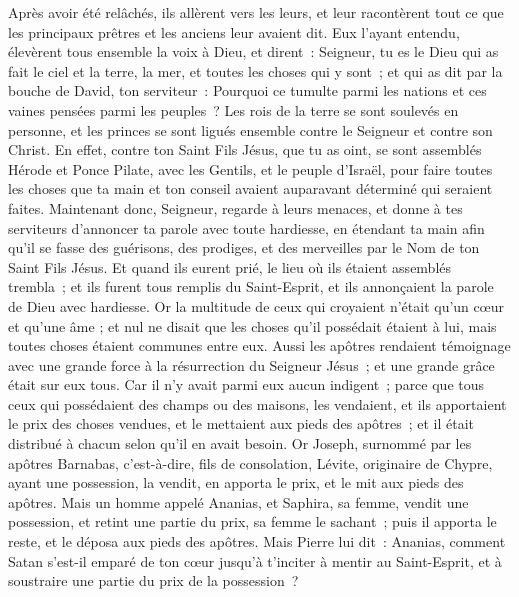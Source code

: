 \begin{multicols}{2}
Après avoir été relâchés, ils allèrent vers les leurs, et leur racontèrent tout ce que les principaux prêtres et les anciens leur avaient dit.
Eux l'ayant entendu, élevèrent tous ensemble la voix à Dieu, et dirent~: Seigneur, tu es le Dieu qui as fait le ciel et la terre, la mer, et toutes les choses qui y sont~;
et qui as dit par la bouche de David, ton serviteur~: Pourquoi ce tumulte parmi les nations et ces vaines pensées parmi les peuples~?
Les rois de la terre se sont soulevés en personne, et les princes se sont ligués ensemble contre le Seigneur et contre son Christ.
En effet, contre ton Saint Fils Jésus, que tu as oint, se sont assemblés Hérode et Ponce Pilate, avec les Gentils, et le peuple d'Israël,
pour faire toutes les choses que ta main et ton conseil avaient auparavant déterminé qui seraient faites.
Maintenant donc, Seigneur, regarde à leurs menaces, et donne à tes serviteurs d'annoncer ta parole avec toute hardiesse,
en étendant ta main afin qu'il se fasse des guérisons, des prodiges, et des merveilles par le Nom de ton Saint Fils Jésus.
Et quand ils eurent prié, le lieu où ils étaient assemblés trembla~; et ils furent tous remplis du Saint-Esprit, et ils annonçaient la parole de Dieu avec hardiesse.
Or la multitude de ceux qui croyaient n'était qu'un cœur et qu'une âme ; et nul ne disait que les choses qu'il possédait étaient à lui, mais toutes choses étaient communes entre eux.
Aussi les apôtres rendaient témoignage avec une grande force à la résurrection du Seigneur Jésus~; et une grande grâce était sur eux tous.
Car il n'y avait parmi eux aucun indigent~; parce que tous ceux qui possédaient des champs ou des maisons, les vendaient, et ils apportaient le prix des choses vendues,
et le mettaient aux pieds des apôtres~; et il était distribué à chacun selon qu'il en avait besoin.
Or Joseph, surnommé par les apôtres Barnabas, c'est-à-dire, fils de consolation, Lévite, originaire de Chypre,
ayant une possession, la vendit, en apporta le prix, et le mit aux pieds des apôtres.
\VerseOne{}Mais un homme appelé Ananias, et Saphira, sa femme, vendit une possession,
et retint une partie du prix, sa femme le sachant~; puis il apporta le reste, et le déposa aux pieds des apôtres.
Mais Pierre lui dit~: Ananias, comment Satan s'est-il emparé de ton cœur jusqu'à t'inciter à mentir au Saint-Esprit, et à soustraire une partie du prix de la possession~?

\end{multicols}
